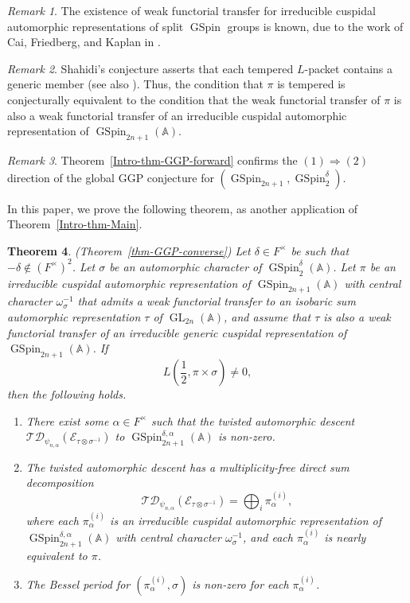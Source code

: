 \documentclass[12pt]{amsart}
\newcommand{\A}{\mathbb{A}}
\newcommand{\TD}{\mathcal{TD}}
\newcommand{\CE}{{\mathcal{E}}}
\newtheorem{theorem}{Theorem}[section]
\theoremstyle{remark}
\newtheorem{remark}[theorem]{Remark}%
\DeclareMathOperator{\GL}{GL}
\DeclareMathOperator{\GSpin}{GSpin}
\begin{document}
\begin{remark}
The existence of weak functorial transfer for irreducible cuspidal automorphic representations of split $\GSpin$ groups is known, due to the work of Cai, Friedberg, and Kaplan in \cite{CaiFriedbergKaplan2024}. 
\end{remark}


\begin{remark}
Shahidi's conjecture \cite{Shahidi1990}  asserts that each tempered $L$-packet contains a generic member (see also \cite{Shahidi2011}).
Thus, the condition that $\pi$ is tempered is conjecturally equivalent to the condition that the weak functorial transfer of $\pi$ is also a weak functorial transfer of an irreducible cuspidal automorphic representation of $\GSpin_{2n+1}(\A)$.
\end{remark}

\begin{remark}
Theorem~\ref{Intro-thm-GGP-forward} confirms the $(1)\Rightarrow (2)$ direction of the global GGP conjecture for $(\GSpin_{2n+1}, \GSpin_2^\delta)$.
\end{remark}

In this paper, we prove the following theorem, as another application of Theorem~\ref{Intro-thm-Main}. 


\begin{theorem}(Theorem~\ref{thm-GGP-converse})
\label{Intro-thm-GGP-converse}
Let $\delta\in F^\times$ be such that $-\delta\not\in (F^\times)^2$. 
Let $\sigma$ be an automorphic character of $\GSpin_2^{\delta}(\A)$.
Let $\pi$ be an irreducible cuspidal automorphic representation of $\GSpin_{2n+1}(\A)$ with central character $\omega_{\sigma}^{-1}$ that admits a weak functorial transfer to an isobaric sum automorphic representation $\tau$ of $\GL_{2n}(\A)$, and assume that $\tau$ is also a weak functorial transfer of an irreducible generic cuspidal representation of $\GSpin_{2n+1}(\A)$.
If
\begin{equation*}
L(\frac{1}{2}, \pi\times\sigma )\not=0,	
\end{equation*}
then the following holds.
\begin{enumerate}
\item There exist some $\alpha\in F^\times$ such that the twisted automorphic descent $\TD_{\psi_{n,\alpha}}(\CE_{\tau\otimes\sigma^{-1}})$ to $\GSpin^{\delta,\alpha}_{2n+1}(\A)$ is non-zero.
\item The twisted automorphic descent has a multiplicity-free direct sum decomposition
\begin{equation*}
\TD_{\psi_{n,\alpha}}(\CE_{\tau\otimes\sigma^{-1}})= \bigoplus_{i} \pi_\alpha^{(i)},	
\end{equation*}
where each $\pi_\alpha^{(i)}$ is an irreducible cuspidal automorphic representation of $\GSpin^{\delta,\alpha}_{2n+1}(\A)$ with central character $\omega_{\sigma}^{-1}$, and each $\pi_\alpha^{(i)}$ is nearly equivalent to $\pi$.
\item 	The Bessel period for $(\pi_{\alpha}^{(i)}, \sigma)$ is non-zero for each $\pi_{\alpha}^{(i)}$.
\end{enumerate} 
\end{theorem}
\end{document}

